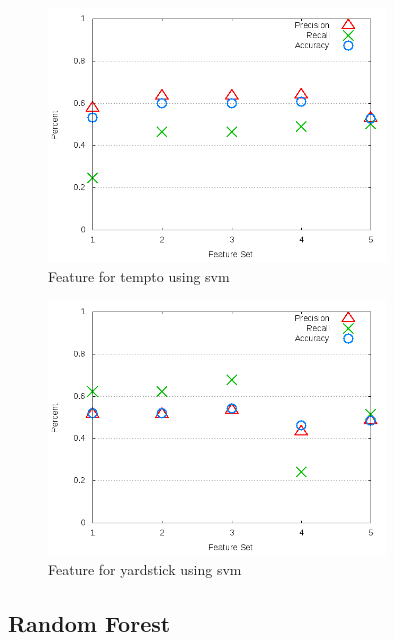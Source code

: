 \clearpage
\begin{figure}[!t]
\centering
\includegraphics[width=0.8\textwidth]{images/svm/test_3/tempto_sample_range.png}
\caption{Feature for tempto using \gls{svm}}
\label{fig:test_3_tempto_svm}
\end{figure}

\begin{figure}[!t]
\centering
\includegraphics[width=0.8\textwidth]{images/svm/test_3/yardstick_sample_range.png}
\caption{Feature for yardstick using \gls{svm}}
\label{fig:test_3_yardstick_svm}
\end{figure}


\subsection{Random Forest}
\label{app_sub:experiment_2_rf}
\clearpage

